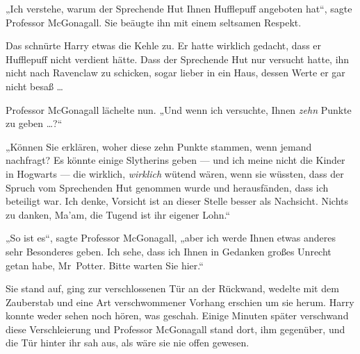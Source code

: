 „Ich verstehe, warum der Sprechende Hut Ihnen Hufflepuff angeboten hat“, sagte Professor McGonagall. Sie beäugte ihn mit einem seltsamen Respekt.

Das schnürte Harry etwas die Kehle zu. Er hatte wirklich gedacht, dass er Hufflepuff nicht verdient hätte. Dass der Sprechende Hut nur versucht hatte, ihn nicht nach Ravenclaw zu schicken, sogar lieber in ein Haus, dessen Werte er gar nicht besaß …

Professor McGonagall lächelte nun.
„Und wenn ich versuchte, Ihnen \emph{zehn} Punkte zu geben …?“

„Können Sie erklären, woher diese zehn Punkte stammen, wenn jemand nachfragt? Es könnte einige Slytherins geben — und ich meine nicht die Kinder in Hogwarts — die wirklich, \emph{wirklich} wütend wären, wenn sie wüssten, dass der Spruch vom Sprechenden Hut genommen wurde und herausfänden, dass ich beteiligt war. Ich denke, Vorsicht ist an dieser Stelle besser als Nachsicht. Nichts zu danken, Ma’am, die Tugend ist ihr eigener Lohn.“

„So ist es“, sagte Professor McGonagall, „aber ich werde Ihnen etwas anderes sehr Besonderes geben. Ich sehe, dass ich Ihnen in Gedanken großes Unrecht getan habe, Mr~Potter. Bitte warten Sie hier.“

Sie stand auf, ging zur verschlossenen Tür an der Rückwand, wedelte mit dem Zauberstab und eine Art verschwommener Vorhang erschien um sie herum. Harry konnte weder sehen noch hören, was geschah. Einige Minuten später verschwand diese Verschleierung und Professor McGonagall stand dort, ihm gegenüber, und die Tür hinter ihr sah aus, als wäre sie nie offen gewesen.

